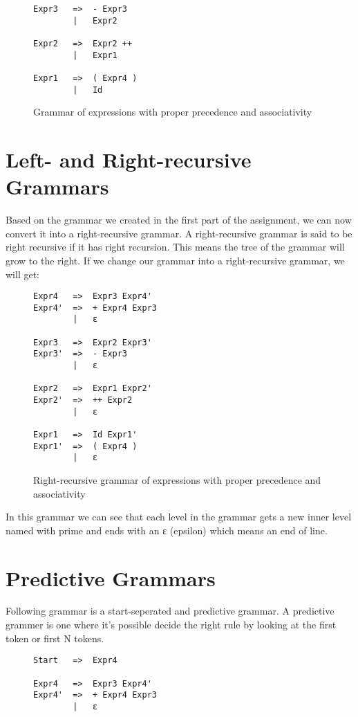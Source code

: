 \documentclass[hidelinks]{uva-inf-article}
\begin{document}
\begin{flushleft}
\begin{figure}[h]
\begin{lstlisting}
Expr3   =>  - Expr3 
        |   Expr2

Expr2   =>  Expr2 ++ 
        |   Expr1
        
Expr1   =>  ( Expr4 ) 
        |   Id
\end{lstlisting}
\caption{Grammar of expressions with proper precedence and associativity}
\label{fig:1}
\end{figure}
\newpage
\section{Left- and Right-recursive Grammars}
\par Based on the grammar we created in the first part of the assignment, we can now convert it into a
right-recursive grammar. A right-recursive grammar is said to be right recursive if it has right recursion.
This means the tree of the grammar will grow to the right. If we change our grammar into a right-recursive grammar,
we will get:
\begin{figure}[h]
\begin{lstlisting}
Expr4   =>  Expr3 Expr4'
Expr4'  =>  + Expr4 Expr3
        |   ε
    
Expr3   =>  Expr2 Expr3'
Expr3'  =>  - Expr3
        |   ε
    
Expr2   =>  Expr1 Expr2'
Expr2'  =>  ++ Expr2
        |   ε
    
Expr1   =>  Id Expr1'
Expr1'  =>  ( Expr4 )
        |   ε
\end{lstlisting}
\caption{Right-recursive grammar of expressions with proper precedence and associativity}
\label{fig:2}
\end{figure}
\par In this grammar we can see that each level in the grammar gets a new inner level named with prime and ends with an ε (epsilon)
which means an end of line.

\section{Predictive Grammars}
Following grammar is a start-seperated and predictive grammar.
A predictive grammer is one where it's possible decide the right rule by looking at the first token or first N tokens.
\begin{figure}[h]
\begin{lstlisting}
Start   =>  Expr4

Expr4   =>  Expr3 Expr4'
Expr4'  =>  + Expr4 Expr3
        |   ε


\end{lstlisting}
\end{figure}
\end{flushleft}
\end{document}
